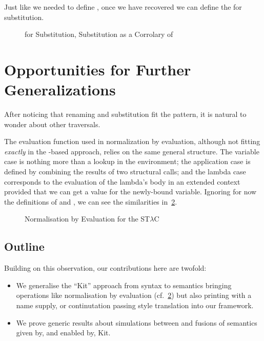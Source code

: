 Just like we needed  to define , once we have recovered 
we can define the  for substitution.

\begin{figure}[h]
\begin{minipage}{0.4\textwidth}
\end{minipage}
\begin{minipage}{0.6\textwidth}
\end{minipage}
\caption{ for Substitution, Substitution as a Corrolary of \label{fig:subkit}}
\end{figure}

\section{Opportunities for Further Generalizations}

After noticing that renaming and substitution fit the pattern, it is
natural to wonder about other traversals.

The evaluation function used in normalization by evaluation, although
not fitting \emph{exactly} in the -based approach, relies on
the same general structure. The variable case is nothing more than a
lookup in the environment; the application case is defined by combining
the results of two structural calls; and the lambda case corresponds to
the evaluation of the lambda's body in an extended context provided that
we can get a value for the newly-bound variable. Ignoring for now the
definitions of  and , we can see the similarities
in~\cref{nbe}.

\begin{figure}[h]
\caption{Normalisation by Evaluation for the ST$λ$C\label{nbe}}
\end{figure}

\subsection{Outline} Building on this observation, our contributions
here are twofold:

\begin{itemize}
  \item
    We generalise the ``Kit'' approach from syntax to semantics bringing
    operations like normalisation by evaluation (cf.~\cref{nbe}) but also
    printing with a name supply, or continutation passing style translation
    into our framework.

  \item
    We prove generic results about simulations between and fusions of
    semantics given by, and enabled by, Kit.
\end{itemize}

